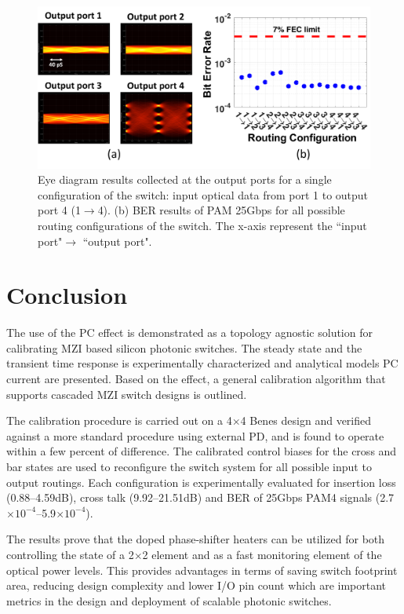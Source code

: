 \begin{figure}[h!]
\centering\includegraphics[width=13.5cm]{Chapter5/fig9_eye2}
\caption{Eye diagram results collected at the output ports for a single configuration of the switch: input optical data from port 1 to output port 4 (1$\rightarrow$4). (b) BER results of PAM 25Gbps for all possible routing configurations of the switch. The x-axis represent the ``input port"$\rightarrow$ ``output port".}
\end{figure} 



\section{Conclusion}

The use of the PC effect is demonstrated as a topology agnostic solution for calibrating MZI based silicon photonic switches. The steady state and the transient time response is experimentally characterized and analytical models PC current are presented. Based on the effect, a general calibration algorithm that supports cascaded MZI switch designs is outlined. 

The calibration procedure is carried out on a 4$\times$4 Benes design and verified against a more standard procedure using external PD, and is found to operate within a few percent of difference. The calibrated control biases for the cross and bar states are used to reconfigure the switch system for all possible input to output routings. Each configuration is experimentally evaluated for insertion loss (0.88--4.59dB), cross talk (9.92--21.51dB) and BER of 25Gbps PAM4 signals (2.7$\times 10^{-4}$--5.9$\times 10^{-4}$). 

The results prove that the doped phase-shifter heaters can be utilized for both controlling the state of a 2$\times$2 element and as a fast monitoring element of the optical power levels. This provides advantages in terms of saving switch footprint area, reducing design complexity and lower I/O pin count which are important metrics in the design and deployment of scalable photonic switches.